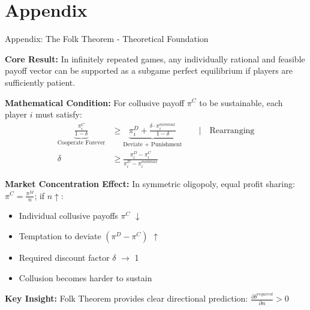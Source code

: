 \documentclass[10pt, aspectratio=169]{beamer}
\begin{document}

\appendix

\section{Appendix}

\begin{frame}{Appendix: The Folk Theorem - Theoretical Foundation}

    \textbf{Core Result:} In infinitely repeated games, any individually rational and feasible payoff vector can be supported as a subgame perfect equilibrium if players are sufficiently patient.
    
    \textbf{Mathematical Condition:}
    For collusive payoff $\pi^C$ to be sustainable, each player $i$ must satisfy:
    \begin{align*}
        \underbrace{\frac{\pi_i^C}{1-\delta}}_{\text{Cooperate Forever}} &\geq \underbrace{\pi_i^D + \frac{\delta \cdot \pi_i^{minmax}}{1-\delta}}_{\text{Deviate + Punishment}} \quad\quad \vert \quad\text{Rearranging} \\
        \delta &\geq \frac{\pi_i^D - \pi_i^C}{\pi_i^D - \pi_i^{minmax}}
    \end{align*}
    
    \textbf{Market Concentration Effect:}
    In symmetric oligopoly, equal profit sharing: $\pi^C = \frac{\pi^M}{n}$; if $n\uparrow$:
    \begin{multicols}{2}
        \begin{itemize}
            \item Individual collusive payoffs $\pi^C$ $\downarrow$
            \item Temptation to deviate $(\pi^D - \pi^C)$ $\uparrow$ 
            \item Required discount factor $\delta$ $\rightarrow$ 1
            \item Collusion becomes harder to sustain
        \end{itemize}
    \end{multicols}
    \textbf{Key Insight:}
    Folk Theorem provides clear directional prediction: $\frac{\partial \delta^{required}}{\partial n} > 0$

\end{frame}
\end{document}
